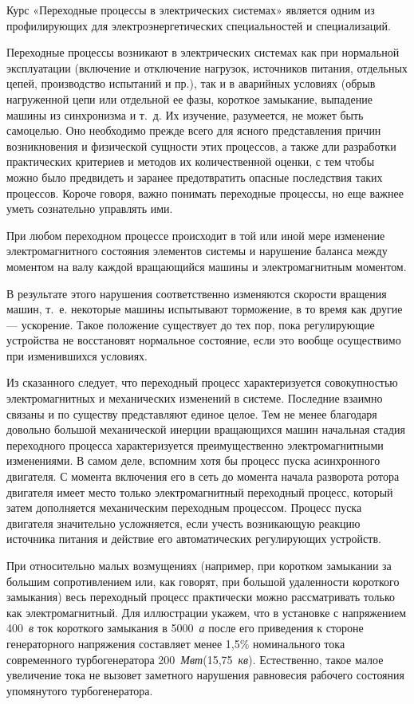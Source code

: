Курс «Переходные процессы в электрических системах» является одним из профилирующих для электроэнергетических специальностей и специализаций.

Переходные процессы возникают в электрических системах как при нормальной эксплуатации (включение и отключение нагрузок, источников питания, отдельных цепей, производство испытаний и пр.), так и в аварийных условиях (обрыв нагруженной цепи или отдельной ее фазы, короткое замыкание, выпадение машины из синхронизма и т.~д. Их изучение, разумеется, не может быть самоцелью. Оно необходимо прежде всего для ясного представления причин возникновения и физической сущности этих процессов, а также дли разработки практических критериев и методов их количественной оценки, с тем чтобы можно было предвидеть и заранее предотвратить опасные последствия таких процессов. Короче говоря, важно понимать переходные процессы, но еще важнее уметь сознательно управлять ими.

При любом переходном процессе происходит в той или иной мере изменение электромагнитного состояния элементов системы и нарушение баланса между моментом на валу каждой вращающийся машины и электромагнитным моментом.

В результате этого нарушения соответственно изменяются скорости вращения машин, т.~е. некоторые машины испытывают торможение, в то время как другие --- ускорение. Такое положение существует до тех пор, пока регулирующие устройства не восстановят нормальное состояние, если это вообще осуществимо при изменившихся условиях.

Из сказанного следует, что переходный процесс характеризуется совокупностью электромагнитных и механических изменений в системе. Последние взаимно связаны и по существу представляют единое целое. Тем не менее благодаря довольно большой механической инерции вращающихся машин начальная стадия переходного процесса характеризуется преимущественно электромагнитными изменениями. В самом деле, вспомним хотя бы процесс пуска асинхронного двигателя. С момента включения его в сеть до момента начала разворота ротора двигателя имеет место только электромагнитный переходный процесс, который затем дополняется механическим переходным процессом. Процесс пуска двигателя значительно усложняется, если учесть возникающую реакцию источника питания и действие его автоматических регулирующих устройств.

При относительно малых возмущениях (например, при коротком замыкании за большим сопротивлением или, как говорят, при большой удаленности короткого замыкания) весь переходный процесс практически можно рассматривать только как электромагнитный. Для иллюстрации укажем, что в установке с напряжением 400~\textit{в} ток короткого замыкания в 5000~\textit{а} после его приведения к стороне генераторного напряжения составляет менее 1,5\% номинального тока современного турбогенератора 200~\textit{Мвт}(15,75~\textit{кв}). Естественно, такое малое увеличение тока не вызовет заметного нарушения равновесия рабочего состояния упомянутого турбогенератора.

